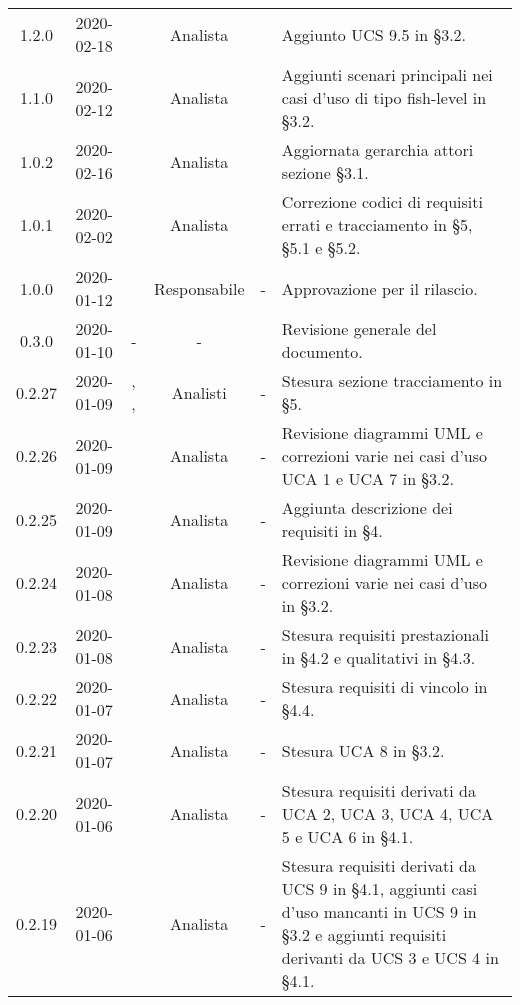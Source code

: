 {\begin{longtable}{ c c  C{2.3cm} c C{3cm} C{3.2cm}}
1.2.0 & 2020-02-18 & \DF{} & Analista & \CE{} & Aggiunto UCS 9.5 in §3.2. \\

1.1.0 & 2020-02-12 & \DF{} & Analista & \CE{} & Aggiunti scenari principali nei casi d'uso di tipo fish-level in §3.2. \\

1.0.2 & 2020-02-16 & \AT{} & Analista & \CE{} & Aggiornata gerarchia attori sezione §3.1. \\

1.0.1 & 2020-02-02 & \AT{} & Analista & \CE{} & Correzione codici di requisiti errati e tracciamento in §5, §5.1 e §5.2. \\

1.0.0 & 2020-01-12 & \AT{} & Responsabile & - & Approvazione per il rilascio. \\

0.3.0 & 2020-01-10 & - & - & \SE{} & Revisione generale del documento. \\

0.2.27 & 2020-01-09 & \CE{}, \PF{}, \DF{} & Analisti & - & Stesura sezione tracciamento in §5. \\

0.2.26 & 2020-01-09 & \PF{} & Analista & - & Revisione diagrammi UML e correzioni varie nei casi d'uso UCA 1 e UCA 7 in §3.2. \\

0.2.25 & 2020-01-09 & \CE{} & Analista & - & Aggiunta descrizione dei requisiti in §4. \\

0.2.24 & 2020-01-08 & \CE{} & Analista & - & Revisione diagrammi UML e correzioni varie nei casi d'uso in §3.2. \\

0.2.23 & 2020-01-08 & \DF{} & Analista & - & Stesura requisiti prestazionali in §4.2 e qualitativi in §4.3. \\

0.2.22 & 2020-01-07 & \PF{} & Analista & - & Stesura requisiti di vincolo in §4.4. \\

0.2.21 & 2020-01-07 & \PF{} & Analista & - & Stesura UCA 8 in §3.2. \\

0.2.20 & 2020-01-06 & \PF{} & Analista & - & Stesura requisiti derivati da UCA 2, UCA 3, UCA 4, UCA 5 e UCA 6 in §4.1. \\

0.2.19 & 2020-01-06 & \DF{} & Analista & - & Stesura requisiti derivati da UCS 9 in §4.1, aggiunti casi d'uso mancanti in UCS 9 in §3.2 e aggiunti requisiti derivanti da UCS 3 e UCS 4 in §4.1. \\


\end{longtable}}

